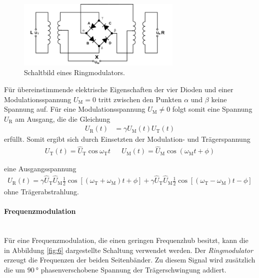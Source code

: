 \begin{figure}
\centering
\includegraphics[width=0.7\textwidth]{figures/ringmodulator.PNG}
\caption{Schaltbild eines Ringmodulators.\cite{sample}}
\label{fig:5}
\end{figure}

Für übereinstimmende elektrische Eigenschaften
der vier Dioden und einer Modulationsspannung $U_{\text{M}}=0$
tritt zwischen den Punkten $\alpha$ und $\beta$
keine Spannung auf. Für eine Modulationsspannung
$U_{\text{M}}\neq0$ folgt somit eine
Spannung $U_{\text{R}}$ am Ausgang, die die
Gleichung
\FloatBarrier
\begin{align}
  U_{\text{R}}(t) &= \gamma U_{\text{M}}(t)U_{\text{T}}(t)
\end{align}
erfüllt. Somit ergibt sich durch Einsetzten
der Modulation- und Trägerspannung
\begin{align}
  U_{\text{T}}(t) =\hat{U}_{\text{T}}\cos\omega_{\text{T}}t& &
  U_{\text{M}}(t) = \hat{U}_{\text{M}}\cos(\omega_{\text{M}}t+\phi)
  \end{align}

eine Ausgangsspannung
\begin{align}
U_{\text{R}}(t) =\gamma \hat{U}_{\text{T}} \hat{U}_{\text{M}}\frac{1}{2}\cos\left[(\omega_{\text{T}}+\omega_{\text{M}})t+\phi\right] + \gamma \hat{U}_{\text{T}} \hat{U}_{\text{M}}\frac{1}{2}\cos\left[(\omega_{\text{T}}-\omega_{\text{M}})t-\phi\right]
\end{align}
ohne Trägerabstrahlung.


\paragraph{Frequenzmodulation}
\mbox{}\\
Für eine Frequenzmodulation, die einen geringen Frequenzhub besitzt,
kann die in Abbildung \ref{fig:6} dargestellte
Schaltung verwendet werden.
Der \textit{Ringmodulator} erzeugt die Frequenzen der beiden Seitenbänder.
Zu diesem Signal wird zusätzlich die um $\SI{90}{\degree}$ phasenverschobene
Spannung der Trägerschwingung addiert.

